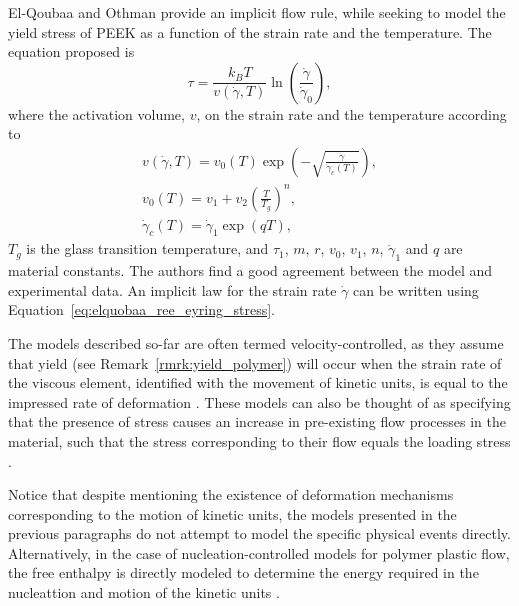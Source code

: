 El-Qoubaa and Othman \citep{el-qoubaaStrainRateSensitivity2016} provide an implicit flow rule, while seeking to model the yield stress of PEEK as a function of the strain rate and the temperature.
The equation proposed is
\begin{equation}
	\label{eq:elquobaa_ree_eyring_stress}
	\tau = \frac{k_B T}{v(\dot \gamma, T)}\ln\left(\frac{\dot\gamma}{\dot\gamma_0}\right),
\end{equation}
where the activation volume, $v$, on the strain rate and the temperature according to
\begin{gather}
	v(\dot\gamma, T) = v_0(T)\exp\left(-\sqrt{\frac{\dot\gamma}{\dot \gamma_c(T)} }\right),\\
	v_0(T) = v_1 + v_2 \left(\frac{T}{T_g}\right)^n,\\
	\dot \gamma_c (T) = \dot \gamma_1 \exp(q T),
\end{gather}
$T_g$ is the glass transition temperature, and $\tau_1$, $m$, $r$, $v_0$, $v_1$, $n$, $\dot\gamma_1$ and $q$ are material constants.
The authors find a good agreement between the model and experimental data.
An implicit law for the strain rate $\dot \gamma$ can be written using Equation~\eqref{eq:elquobaa_ree_eyring_stress}.

The models described so-far are often termed velocity-controlled, as they assume that yield (see Remark~\ref{rmrk:yield_polymer}) will occur when the strain rate of the viscous element, identified with the movement of kinetic units, is equal to the impressed rate of deformation \citep{fotheringhamRoleRecoveryForces1978}.
These models can also be thought of as specifying that the presence of stress causes an increase in pre-existing flow processes in the material, such that the stress corresponding to their flow equals the loading stress \citep{wardIntroductionMechanicalProperties2004}.

Notice that despite mentioning the existence of deformation mechanisms corresponding to the motion of kinetic units, the models presented in the previous paragraphs do not attempt to model the specific physical events directly.
Alternatively, in the case of nucleation-controlled models for polymer plastic flow, the free enthalpy is directly modeled to determine the energy required in the nucleattion and motion of the kinetic units \citep{fotheringhamRoleRecoveryForces1978, wardIntroductionMechanicalProperties2004}.

